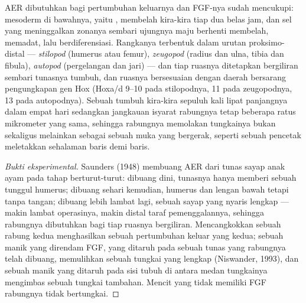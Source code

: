 \begin{proposition}\label{prop:b2:limb-organogenesis:aer}
AER dibutuhkan bagi pertumbuhan keluarnya dan FGF-nya sudah mencukupi:
mesoderm di bawahnya, yaitu \emph{}, membelah kira-kira
tiap dua belas jam, dan sel yang meninggalkan zonanya sembari ujungnya
maju berhenti membelah, memadat, lalu berdiferensiasi. Rangkanya
terbentuk dalam urutan proksimo-distal --- \emph{stilopod} (humerus
atau femur), \emph{zeugopod} (radius dan ulna, tibia dan fibula),
\emph{autopod} (pergelangan dan jari) --- dan tiap ruasnya ditetapkan
bergiliran sembari tunasnya tumbuh, dan ruasnya bersesuaian dengan
daerah bersarang pengungkapan gen Hox (Hoxa/d 9--10 pada stilopodnya,
11 pada zeugopodnya, 13 pada autopodnya). Sebuah  tumbuh
kira-kira sepuluh kali lipat panjangnya dalam empat hari sedangkan
jangkauan isyarat rabungnya tetap beberapa ratus mikrometer yang sama,
sehingga rabungnya memolakan tungkainya bukan sekaligus melainkan
sebagai sebuah muka yang bergerak, seperti sebuah pencetak meletakkan
sehalaman baris demi baris.
\end{proposition}
\begin{proof}[Bukti eksperimental]
Saunders (1948) membuang AER dari tunas sayap anak ayam pada tahap
berturut-turut: dibuang dini, tunasnya hanya memberi sebuah tunggul
humerus; dibuang sehari kemudian, humerus dan lengan bawah tetapi tanpa
tangan; dibuang lebih lambat lagi, sebuah sayap yang nyaris lengkap ---
makin lambat operasinya, makin distal taraf pemenggalannya, sehingga
rabungnya dibutuhkan bagi tiap ruasnya bergiliran. Mencangkokkan sebuah
rabung kedua menghasilkan sebuah pertumbuhan keluar yang kedua; sebuah
manik yang direndam FGF, yang ditaruh pada sebuah tunas yang rabungnya
telah dibuang, memulihkan sebuah tungkai yang lengkap (Niswander,
1993), dan sebuah manik yang ditaruh pada sisi tubuh di antara medan
tungkainya mengimbas sebuah tungkai tambahan. Mencit yang tidak memiliki
FGF rabungnya tidak bertungkai.
\end{proof}

